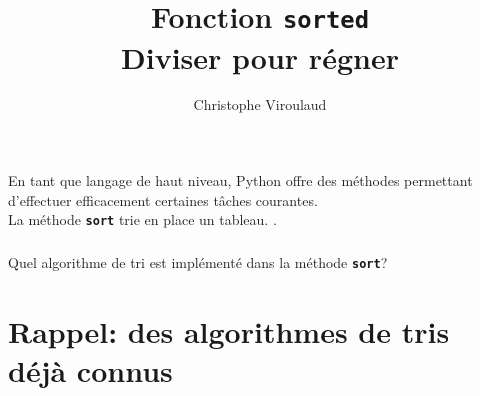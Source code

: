 \documentclass[svgnames,11pt]{beamer}
\author[]{Christophe Viroulaud}
\title{Fonction \textbf{\texttt{sorted}}\\Diviser pour régner}
\date{\framebox{\textbf{Algo 01}}}
\institute{Terminale - NSI}
\begin{document}
\begin{frame}
    \titlepage
\end{frame}
\begin{frame}
    \frametitle{}

    En tant que langage de haut niveau, Python offre des méthodes permettant d'effectuer efficacement certaines tâches courantes.\\
    La méthode \textbf{\texttt{sort}} trie en place un tableau.
    .
\end{frame}
\begin{frame}
    \frametitle{}

    \begin{framed}
        \centering Quel algorithme de tri est implémenté dans la méthode \textbf{\texttt{sort}}?
    \end{framed}

\end{frame}
\section{Rappel: des algorithmes de tris déjà connus}
\end{document}
